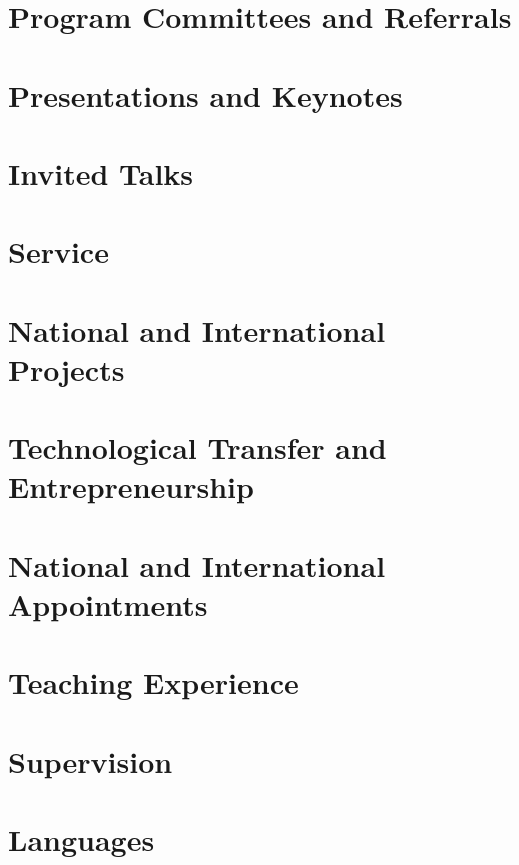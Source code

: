 \documentclass[10pt,a4paper]{article}
\begin{document}
\section*{Program Committees and Referrals}%


\section*{Presentations and Keynotes}%


\section*{Invited Talks}%


\section*{Service}


\section*{National and International Projects}%


\section*{Technological Transfer and Entrepreneurship}%


\section*{National and International Appointments}%


\section*{Teaching Experience}%


\section*{Supervision}%


\section*{Languages}%

\end{document}
